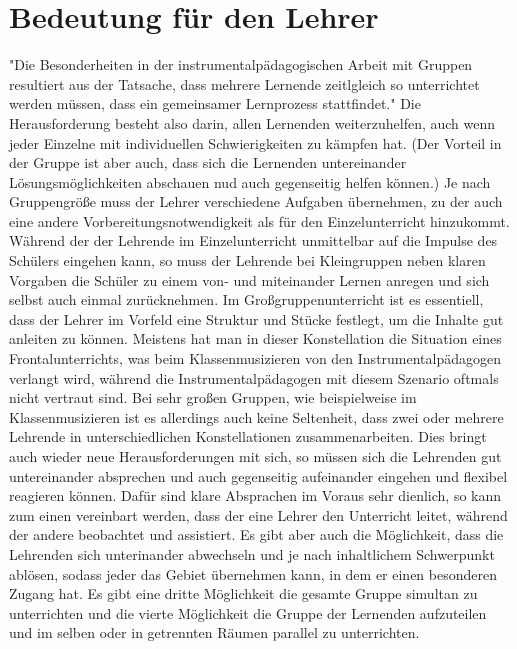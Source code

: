 \section{Bedeutung für den Lehrer}

"Die Besonderheiten in der instrumentalpädagogischen Arbeit mit Gruppen
resultiert aus der Tatsache, dass mehrere Lernende zeitlgleich so unterrichtet
werden müssen, dass ein gemeinsamer Lernprozess stattfindet."
\autocite[221]{busch:grundwissen_instrumentalpaedagogik} Die Herausforderung
besteht also darin, allen Lernenden weiterzuhelfen, auch wenn jeder Einzelne mit
individuellen Schwierigkeiten zu kämpfen hat. (Der Vorteil in der Gruppe ist
aber auch, dass sich die Lernenden untereinander Lösungsmöglichkeiten abschauen
nud auch gegenseitig helfen können.) Je nach Gruppengröße muss der Lehrer
verschiedene Aufgaben übernehmen, zu der auch eine andere
Vorbereitungsnotwendigkeit als für den Einzelunterricht hinzukommt. Während der der Lehrende im
Einzelunterricht unmittelbar auf die Impulse des Schülers eingehen kann, so muss
der Lehrende bei Kleingruppen neben klaren Vorgaben die Schüler zu einem von-
und miteinander Lernen anregen und sich selbst auch einmal zurücknehmen. Im
Großgruppenunterricht ist es essentiell, dass der Lehrer im Vorfeld eine
Struktur und Stücke festlegt, um die Inhalte gut anleiten zu
können.\autocite[220]{busch:grundwissen_instrumentalpaedagogik} Meistens hat man
in dieser Konstellation die Situation eines Frontalunterrichts, was beim
Klassenmusizieren von den Instrumentalpädagogen verlangt wird, während die
Instrumentalpädagogen mit diesem Szenario oftmals nicht vertraut sind. Bei sehr
großen Gruppen, wie beispielweise im Klassenmusizieren ist es allerdings auch
keine Seltenheit, dass zwei oder mehrere Lehrende in unterschiedlichen
Konstellationen zusammenarbeiten. Dies bringt auch wieder neue Herausforderungen
mit sich, so müssen sich die Lehrenden gut untereinander absprechen und auch
gegenseitig aufeinander eingehen und flexibel reagieren können. Dafür sind klare
Absprachen im Voraus sehr dienlich, so kann zum einen vereinbart werden, dass
der eine Lehrer den Unterricht leitet, während der andere beobachtet und
assistiert. Es gibt aber auch die Möglichkeit, dass die Lehrenden sich
unterinander abwechseln und je nach inhaltlichem Schwerpunkt ablösen, sodass
jeder das Gebiet übernehmen kann, in dem er einen besonderen Zugang hat. Es gibt
eine dritte Möglichkeit die gesamte Gruppe simultan zu unterrichten und die
vierte Möglichkeit die Gruppe der Lernenden aufzuteilen und im selben oder in
getrennten Räumen parallel zu unterrichten. 

